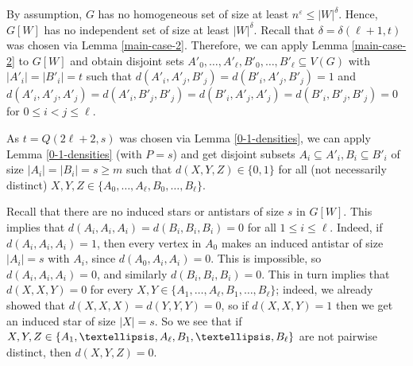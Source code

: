 \documentclass[11pt]{article}
\let\oldendproof\endproof
\renewenvironment{proof}[1][\proofname]{%
	\oldproof[\bf #1]%
}{\oldendproof}
\theoremstyle{plain}
\begin{document}
\begin{proof}
    By assumption, $G$ has no homogeneous set of size at least $n^\varepsilon \leq |W|^{\delta}$. Hence, $G[W]$ has no independent set of size at least $|W|^{\delta}$. Recall that $\delta = \delta(\ell+1,t)$ was chosen via Lemma \ref{main-case-2}.
    Therefore, we can apply Lemma \ref{main-case-2} to $G[W]$ and obtain disjoint sets $A'_0, \dots, A'_{\ell}, B'_0, \dots, B'_{\ell} \subseteq V(G)$ with $|A'_i|=|B'_i|=t$ such that $d(A'_i,A'_j,B'_j) = d(B'_i,A'_j,B'_j) = 1$ and $d(A'_i,A'_j,A'_j) = d(A'_i,B'_j,B'_j) = d(B'_i,A'_j,A'_j) = d(B'_i,B'_j,B'_j) = 0$ for $0 \leq i<j \leq {\ell}$.

    As $t=Q(2\ell+2,s)$ was chosen via Lemma \ref{0-1-densities}, we can apply Lemma \ref{0-1-densities} (with $P = s$) and get disjoint subsets $A_i \subseteq A'_i, B_i \subseteq B'_i$ of size $|A_i|=|B_i|=s \geq m$ such that $d(X,Y,Z) \in \{0,1\}$ for all (not necessarily distinct) $X,Y,Z \in \{A_0,\dots,A_{\ell},B_0,\dots,B_{\ell}\}$. 
    
    Recall that there are no induced stars or antistars of size $s$ in $G[W]$. This implies that $d(A_i,A_i,A_i)=d(B_i,B_i,B_i)=0$ for all $1 \leq i \leq \ell$. Indeed, if $d(A_i,A_i,A_i) = 1$, then every vertex in $A_0$ makes an induced antistar of size $|A_i| = s$ with $A_i$, since $d(A_0,A_i,A_i) = 0$. This is impossible, so $d(A_i,A_i,A_i) = 0$, and similarly 
    $d(B_i,B_i,B_i) = 0$. 
    This in turn implies that $d(X,X,Y)=0$ for every $X, Y \in \{A_1,\dots,A_{\ell}, B_1, \dots, B_{\ell}\}$; indeed, we already showed that $d(X,X,X) = d(Y,Y,Y) = 0$, so if \linebreak $d(X,X,Y) = 1$ then we get an induced star of size $|X| = s$. So we see that if $X,Y,Z \in \linebreak
    \{A_1,\dots,A_{\ell},B_1,\dots,B_{\ell}\}$ are not pairwise distinct, then $d(X,Y,Z) = 0$.
    

\end{proof}
\end{document}
